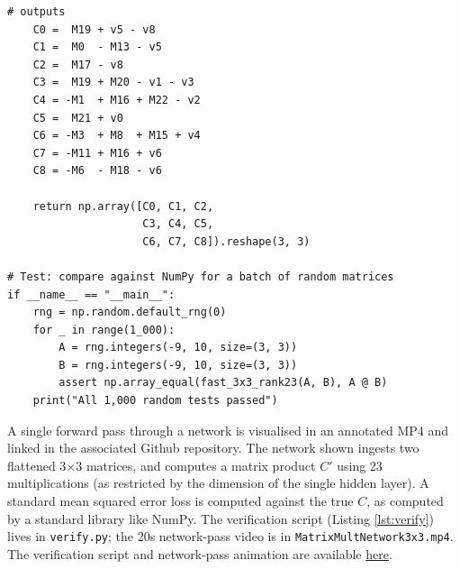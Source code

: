 \documentclass[11pt]{article}
\begin{document}
\begin{lstlisting}[style=py,caption={Python verification script},label={lst:verify}]
    # outputs
    C0 =  M19 + v5 - v8
    C1 =  M0  - M13 - v5
    C2 =  M17 - v8
    C3 =  M19 + M20 - v1 - v3
    C4 = -M1  + M16 + M22 - v2
    C5 =  M21 + v0
    C6 = -M3  + M8  + M15 + v4
    C7 = -M11 + M16 + v6
    C8 = -M6  - M18 - v6

    return np.array([C0, C1, C2,
                     C3, C4, C5,
                     C6, C7, C8]).reshape(3, 3)

# Test: compare against NumPy for a batch of random matrices
if __name__ == "__main__":
    rng = np.random.default_rng(0)
    for _ in range(1_000):
        A = rng.integers(-9, 10, size=(3, 3))
        B = rng.integers(-9, 10, size=(3, 3))
        assert np.array_equal(fast_3x3_rank23(A, B), A @ B)
    print("All 1,000 random tests passed")
\end{lstlisting}

A single forward pass through a network is visualised in an annotated MP4 and linked in the associated Github repository. The network shown ingests two flattened 3$\times$3 matrices, and computes a matrix product $C'$ using 23 multiplications (as restricted by the dimension of the single hidden layer). A standard mean squared error loss is computed against the true $C$, as computed by a standard library like NumPy. The verification script (Listing \ref{lst:verify}) lives in \texttt{verify.py}; the 20s network-pass video is in \texttt{MatrixMultNetwork3x3.mp4}. The verification script and network-pass animation are available \href{https://github.com/Joshua-Stapleton/60_addition_rank_23_scheme}{here}.  

\newpage
\end{document}

